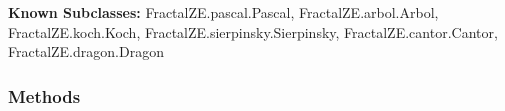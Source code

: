     \label{FractalZE:fractal:Fractal}
\textbf{Known Subclasses:}
FractalZE.pascal.Pascal,
    FractalZE.arbol.Arbol,
    FractalZE.koch.Koch,
    FractalZE.sierpinsky.Sierpinsky,
    FractalZE.cantor.Cantor,
    FractalZE.dragon.Dragon



  \subsubsection{Methods}

    \label{FractalZE:fractal:Fractal:graph}

    \vspace{0.5ex}

